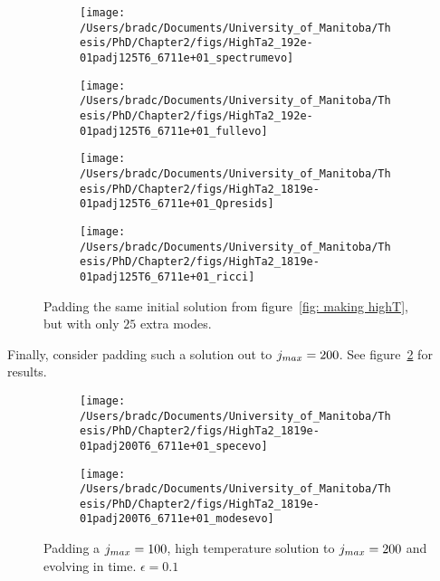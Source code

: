 \documentclass[../PhD.tex]{subfiles}
\begin{document}
\begin{figure}[h]
	\centering
	\begin{subfigure}[t]{0.45\textwidth}
		\texttt{[image: /Users/bradc/Documents/University\_of\_Manitoba/Thesis/PhD/Chapter2/figs/HighTa2\_192e-01padj125T6\_6711e+01\_spectrumevo]}
	\end{subfigure}
	\;
	\begin{subfigure}[t]{0.45\textwidth}
		\texttt{[image: /Users/bradc/Documents/University\_of\_Manitoba/Thesis/PhD/Chapter2/figs/HighTa2\_192e-01padj125T6\_6711e+01\_fullevo]}
	\end{subfigure}
	\;
	\begin{subfigure}[t]{0.45\textwidth}
		\texttt{[image: /Users/bradc/Documents/University\_of\_Manitoba/Thesis/PhD/Chapter2/figs/HighTa2\_1819e-01padj125T6\_6711e+01\_Qpresids]}
	\end{subfigure}
	\;
	\begin{subfigure}[t]{0.45\textwidth}
		\texttt{[image: /Users/bradc/Documents/University\_of\_Manitoba/Thesis/PhD/Chapter2/figs/HighTa2\_1819e-01padj125T6\_6711e+01\_ricci]}
	\end{subfigure}
	\caption[Evolution of the spectrum, absolute and relative residual, and Ricci scalar for a high-temperature solution that has been padded with $25$ extra modes]{Padding the same initial solution from figure~\ref{fig: making highT}, but with only $25$ extra modes.}
	\label{fig:HighTa2_1819e-01padj125T6_6711e+01_evo}
\end{figure}

Finally, consider padding such a solution out to $j_{max} = 200$. See figure~\ref{fig:HighTa2_1819e-01padj200T6_6711e+01_evo} for results.

\begin{figure}[h]
	\centering
	\begin{subfigure}[t]{0.45\textwidth}
		\texttt{[image: /Users/bradc/Documents/University\_of\_Manitoba/Thesis/PhD/Chapter2/figs/HighTa2\_1819e-01padj200T6\_6711e+01\_specevo]}
	\end{subfigure}
	\;
	\begin{subfigure}[t]{0.45\textwidth}
		\texttt{[image: /Users/bradc/Documents/University\_of\_Manitoba/Thesis/PhD/Chapter2/figs/HighTa2\_1819e-01padj200T6\_6711e+01\_modesevo]}
	\end{subfigure}
	\caption[Evolution of the spectrum of a high-temperature solution padded with $100$ modes]{Padding a $j_{max} = 100$, high temperature solution to $j_{max} = 200$ and evolving in time. $\epsilon = 0.1$}
	\label{fig:HighTa2_1819e-01padj200T6_6711e+01_evo}
\end{figure}
\end{document}
